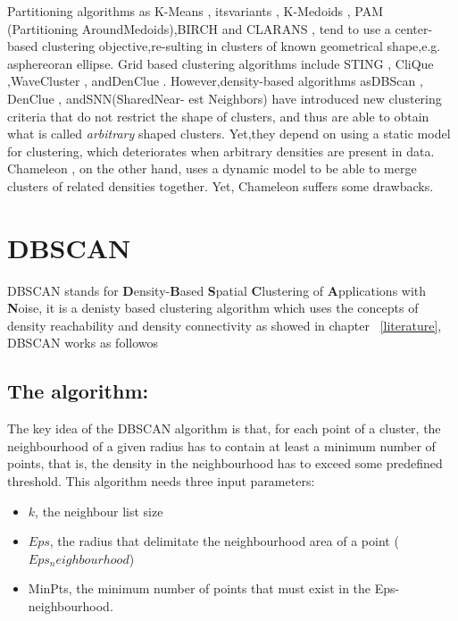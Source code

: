Partitioning algorithms as K-Means \citep{clustering_1}, itsvariants \citep{clustering_2} \citep{clustering_3}, K-Medoids \citep{clustering_4}, PAM \citep{clustering_5} (Partitioning AroundMedoids),BIRCH \citep{clustering_6} and
CLARANS \citep{clustering_7}, tend to use a center-based clustering objective,re-sulting in clusters of known geometrical shape,e.g. asphereoran ellipse. Grid based clustering algorithms include STING \citep{clustering_8}, CliQue \citep{clustering_9},WaveCluster \citep{clustering_10}, andDenClue \citep{clustering_11}.
However,density-based
algorithms asDBScan \citep{clustering_12}, DenClue \citep{clustering_11}, andSNN(SharedNear-
est Neighbors) \citep{clustering_13} have introduced new clustering criteria that do not restrict the shape of clusters, and thus are able to obtain what is called \textit{arbitrary} shaped clusters.
Yet,they depend on using a static model for clustering, which deteriorates when arbitrary densities are present in data. Chameleon  \citep{clustering_14}, on the
other hand, uses a dynamic model to be able to merge clusters of related densities together. Yet, Chameleon suffers some drawbacks.

\section{DBSCAN}\label{dbscan}
DBSCAN stands for \textbf{D}ensity-\textbf{B}ased \textbf{S}patial \textbf{C}lustering of \textbf{A}pplications with \textbf{N}oise, it is a denisty based clustering algorithm which uses the concepts of density reachability and density connectivity\citep{literature_1} as showed in chapter ~\ref{literature}, DBSCAN works as followos
\subsection{The algorithm:}
\citep{literature_2}  The key idea of the DBSCAN algorithm is that, for each point of a cluster, the neighbourhood 
of a given radius has to contain at least a minimum number of points, that is, the density in 
the neighbourhood has to exceed some predefined threshold. This algorithm needs three 
input parameters:
\begin{itemize}  
\item{$k$, the neighbour list size} 
\item{$Eps$, the radius that delimitate the neighbourhood area of a point ($Eps_neighbourhood$)}
\item{MinPts, the minimum number of points that must exist in the Eps-neighbourhood.}
\end{itemize} 

